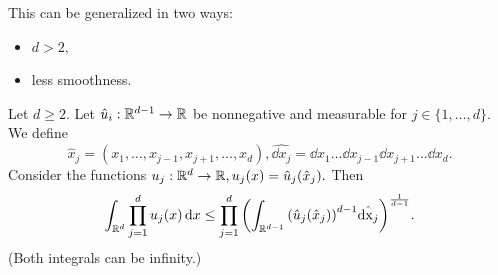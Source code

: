 \documentclass{article}
\begin{document}
This can be generalized in two ways: 
\begin{itemize}
	\item $d > 2,$
	\item less smoothness.
\end{itemize}

\begin{lemma}[Gagliardo]
	Let $d\geq 2$. Let $\hat{u}_i:{\mathbb R}^{d-1} \to {\mathbb R}$ be nonnegative and measurable for $j \in \{1,\dots,d\}.$ We define
	\[
		\hat{x}_j = (x_1, \dots, x_{j-1}, x_{j+1}, \dots, x_d), \hat{\dd{x}_j} = \dd{x}_1 \dots \dd{x}_{j-1} \dd{x}_{j+1} \dots \dd{x}_d.
	\]
	Consider the functions $u_j:{\mathbb R}^d \to {\mathbb R}, u_j\qty(x)=\hat{u}_j(\hat{x}_j).$ Then
	\begin{equation}
		\int_{{\mathbb R}^d}\prod_{j=1}^d u_j\qty(x)\dd{x} \leq \prod_{j=1}^d \qty(\int_{{\mathbb R}^{d-1}}\qty(\hat{u}_j\qty(\hat{x}_j))^{d-1}\hat{\dd{x}_j})^{\frac{1}{d-1}}.
	\end{equation}
	(Both integrals can be infinity.)
\end{lemma}
\end{document}
